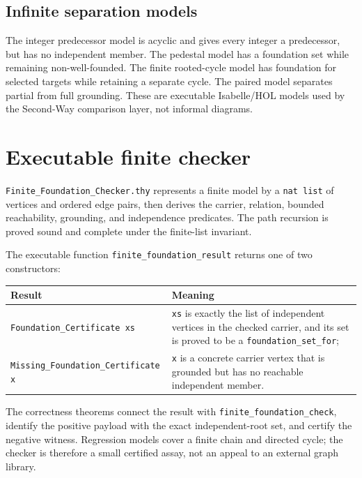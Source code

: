 \documentclass[11pt,a4paper]{article}
\begin{document}
\subsection{Infinite separation models}

The integer predecessor model is acyclic and gives every integer a predecessor,
but has no independent member.  The pedestal model has a foundation set while
remaining non-well-founded.  The finite rooted-cycle model has foundation for
selected targets while retaining a separate cycle.  The paired model separates
partial from full grounding.  These are executable Isabelle/HOL models used by
the Second-Way comparison layer, not informal diagrams.

\section{Executable finite checker}

\texttt{Finite\_Foundation\_Checker.thy} represents a finite model by a
\texttt{nat list} of vertices and ordered edge pairs, then derives the carrier,
relation, bounded reachability, grounding, and independence predicates.  The
path recursion is proved sound and complete under the finite-list invariant.

The executable function \texttt{finite\_foundation\_result} returns one of two
constructors:

\begin{center}
\begin{tabular}{@{}p{.42\linewidth}p{.49\linewidth}@{}}
\toprule
\textbf{Result} & \textbf{Meaning} \\
\midrule
\texttt{Foundation\_Certificate xs} &
\texttt{xs} is exactly the list of independent vertices in the checked
carrier, and its set is proved to be a \texttt{foundation\_set\_for}; \\
\texttt{Missing\_Foundation\_Certificate x} &
\texttt{x} is a concrete carrier vertex that is grounded but has no reachable
independent member. \\
\bottomrule
\end{tabular}
\end{center}

The correctness theorems connect the result with
\texttt{finite\_foundation\_check}, identify the positive payload with the
exact independent-root set, and certify the negative witness.  Regression
models cover a finite chain and directed cycle; the checker is therefore a
small certified assay, not an appeal to an external graph library.
\end{document}
